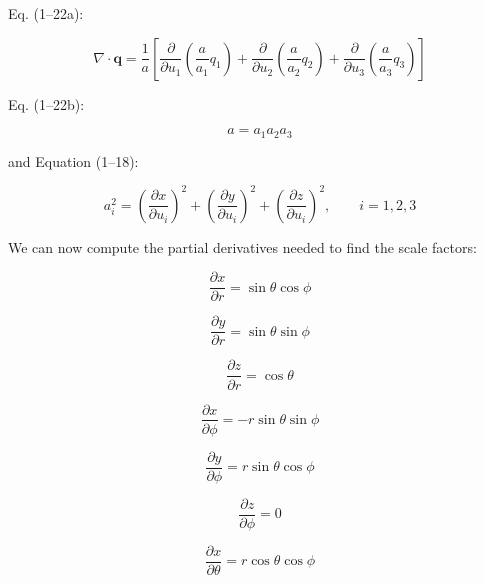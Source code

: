 \documentclass[letterpaper,12pt]{article}
\begin{document}
Eq. (1--22a):

\begin{equation}
    \nabla \cdot \mathbf{q} = \frac{1}{a} \left[ \frac{\partial}{\partial u_1} \left( \frac{a}{a_1} q_1 \right) + \frac{\partial}{\partial u_2} \left( \frac{a}{a_2} q_2 \right) + \frac{\partial}{\partial u_3} \left( \frac{a}{a_3} q_3 \right) \right]
\end{equation}

Eq. (1--22b):

\begin{equation}
    a = a_1 a_2 a_3
\end{equation}

and Equation (1--18):

\begin{equation}
    a^{2}_{i} = \left(\frac{\partial x}{\partial u_i} \right)^2 + \left(\frac{\partial y}{\partial u_i} \right)^2 + \left(\frac{\partial z}{\partial u_i} \right)^2, \qquad i = 1, 2, 3
\end{equation}

We can now compute the partial derivatives needed to find the scale factors:

\begin{equation}
    \frac{\partial x}{\partial r} = \sin{\theta} \cos{\phi}
\end{equation}

\begin{equation}
    \frac{\partial y}{\partial r} = \sin{\theta} \sin{\phi}
\end{equation}

\begin{equation}
    \frac{\partial z}{\partial r} = \cos{\theta}
\end{equation}

\begin{equation}
    \frac{\partial x}{\partial \phi} = -r \sin{\theta} \sin{\phi}
\end{equation}

\begin{equation}
    \frac{\partial y}{\partial \phi} = r \sin{\theta} \cos{\phi}
\end{equation}

\begin{equation}
    \frac{\partial z}{\partial \phi} = 0
\end{equation}

\begin{equation}
    \frac{\partial x}{\partial \theta} = r \cos{\theta} \cos{\phi}
\end{equation}
\end{document}

